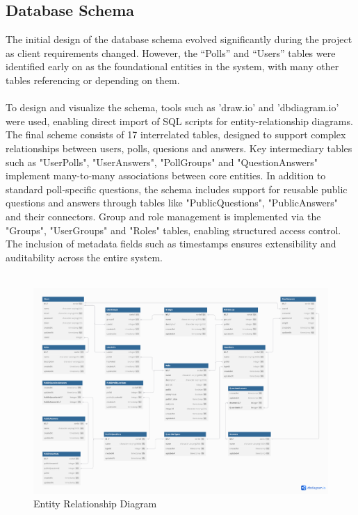 \documentclass[a4paper,12pt]{report}
\begin{document}
\subsection{Database Schema}
The initial design of the database schema evolved significantly during the project as client requirements changed. However, the “Polls” and “Users” tables were identified early on as the foundational entities in the system, with many other tables referencing or depending on them.\\\\
To design and visualize the schema, tools such as 'draw.io' and 'dbdiagram.io' were used, enabling direct import of SQL scripts for entity-relationship diagrams. The final scheme consists of 17 interrelated tables, designed to support complex relationships between users, polls, quesions and answers. Key intermediary tables such as "UserPolls", "UserAnswers", "PollGroups" and "QuestionAnswers" implement many-to-many associations between core entities. In addition to standard poll-specific questions, the schema includes support for reusable public questions and answers through tables like "PublicQuestions", "PublicAnswers" and their connectors. Group and role management is implemented via the "Groups", "UserGroups" and "Roles" tables, enabling structured access control. The inclusion of metadata fields such as timestamps ensures extensibility and auditability across the entire system.\\ \\
\begin{figure}[!htb]  
    \centering
    \includegraphics[width=1.1\textwidth]{pics/ERD_NEW.png}
    \caption{Entity Relationship Diagram}
    \label{fig:new_ERD}
\end{figure}
\newpage
\end{document}
